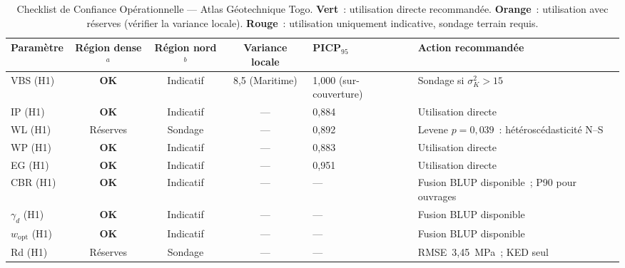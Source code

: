 \documentclass[10pt,a4paper,twocolumn]{article}
\begin{document}
\begin{table}[!ht]
\centering\small
\caption{Checklist de Confiance Opérationnelle --- Atlas Géotechnique Togo.
	\textbf{Vert}~: utilisation directe recommandée.
	\textbf{Orange}~: utilisation avec réserves (vérifier la variance locale).
	\textbf{Rouge}~: utilisation uniquement indicative, sondage terrain requis.}
\label{tab:checklist}
\setlength{\tabcolsep}{4pt}
\begin{tabular}{lcccp{1.6cm}p{6.2cm}}
	\toprule
	Paramètre & Région dense$^a$ & Région nord$^b$ & Variance locale & PICP$_{95}$ & Action recommandée \\
	\midrule
	VBS (H1)    & \cellcolor{green!20}\textbf{OK}
	             & \cellcolor{orange!30}Indicatif
	             & 8,5 (Maritime)
	             & 1,000 (sur-couverture)
	             & Sondage si $\sigma^2_K > 15$ \\
	IP  (H1)    & \cellcolor{green!20}\textbf{OK}
	             & \cellcolor{orange!30}Indicatif
	             & ---
	             & 0,884
	             & Utilisation directe \\
	WL  (H1)    & \cellcolor{orange!30}Réserves
	             & \cellcolor{red!20}Sondage
	             & ---
	             & 0,892
	             & Levene $p=0{,}039$~: hétéroscédasticité N--S \\
	WP  (H1)    & \cellcolor{green!20}\textbf{OK}
	             & \cellcolor{orange!30}Indicatif
	             & ---
	             & 0,883
	             & Utilisation directe \\
	EG  (H1)    & \cellcolor{green!20}\textbf{OK}
	             & \cellcolor{orange!30}Indicatif
	             & ---
	             & 0,951
	             & Utilisation directe \\
	CBR (H1)    & \cellcolor{green!20}\textbf{OK}
	             & \cellcolor{orange!30}Indicatif
	             & ---
	             & ---
	             & Fusion BLUP disponible~; P90 pour ouvrages \\
	$\gamma_d$ (H1) & \cellcolor{green!20}\textbf{OK}
	             & \cellcolor{orange!30}Indicatif
	             & ---
	             & ---
	             & Fusion BLUP disponible \\
	$w_{\mathrm{opt}}$ (H1) & \cellcolor{green!20}\textbf{OK}
	             & \cellcolor{orange!30}Indicatif
	             & ---
	             & ---
	             & Fusion BLUP disponible \\
	Rd  (H1)    & \cellcolor{orange!30}Réserves
	             & \cellcolor{red!20}Sondage
	             & ---
	             & ---
	             & RMSE~3{,}45~MPa~; KED seul \\

\end{tabular}
\end{table}
\end{document}
